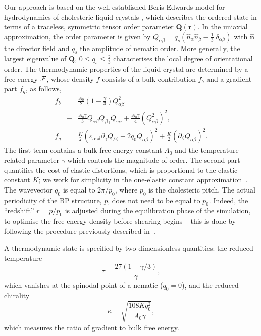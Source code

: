 \documentclass[8.5pt,twoside,twocolumn]{article}
\begin{document}
Our approach is based on the well-established Beris-Edwards model for hydrodynamics of
cholesteric liquid crystals \cite{Beris:1994}, which describes the ordered state 
in terms of a traceless, symmetric tensor order parameter ${\mathbf Q}({\mathbf r})$. 
In the uniaxial approximation, the order parameter is given by
$Q_{\alpha \beta}= q_s ( \hat{n}_\alpha \hat{n}_\beta - \frac{1}{3}\; \delta_{\alpha\beta})$
with $\hat{{\mathbf n}}$ the director field and $q_s$ the amplitude of nematic
order. More generally,
the largest eigenvalue of ${\mathbf Q}$, $0\le q_s\le\frac{2}{3}$
characterises the local degree of orientational order.
The thermodynamic properties of the liquid crystal are determined by a free energy
${\cal F}$, whose density $f$ consists of a bulk contribution $f_b$ and a gradient part $f_g$, as follows,
\begin{eqnarray}
f_b&=&\frac{A_0}{2}\left(1-\frac{\gamma}{3}\right) Q_{\alpha \beta}^2\nonumber\\
&-&\frac{A_0 \gamma}{3}Q_{\alpha \beta} Q_{\beta \gamma} Q_{\gamma \alpha}+\frac{A_0 \gamma}{4}(Q_{\alpha \beta}^2)^2,\nonumber\\
f_g&=&\frac{K}{2}(\varepsilon_{\alpha\gamma\delta} \partial_\gamma Q_{\delta\beta}+2 q_0 Q_{\alpha \beta})^2+\frac{K}{2}(\partial_\beta Q_{\alpha \beta})^2.\label{FE}
\end{eqnarray}
The first term contains a bulk-free energy constant $A_0$ and the temperature-related parameter $\gamma$ which controls the magnitude of order.
The second part quantifies the cost of elastic distortions, which is proportional to the elastic constant $K$;
we work for simplicity in the one-elastic constant approximation~\cite{deGennes}. The wavevector $q_0$ is equal to $2\pi/p_0$, where $p_0$ is the cholesteric pitch.
The actual periodicity of the BP structure, $p$, does not need to be equal to $p_0$.
Indeed, the ``redshift'' $r=p/p_0$ is adjusted during the equilibration phase of the 
simulation, to optimise the free energy density
before shearing begins -- this is done by following the procedure
previously described in~\cite{Alexander:2006}.

A thermodynamic state is specified by two dimensionless quantities: the reduced temperature 
\begin{equation}
\tau=\frac{27(1-\gamma/3)}{\gamma},
\end{equation}
which vanishes at the spinodal point of a nematic ($q_0=0$), 
and the reduced chirality 
\begin{equation}
\kappa=\sqrt{\frac{108 K q_0^2}{A_0 \gamma}},
\end{equation}
which measures the ratio of gradient to bulk free energy.
\end{document}
